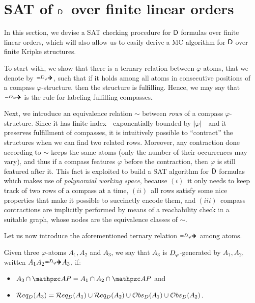 \section{SAT of $\mathsf{D}$\ over finite linear orders}\label{sec:decidability}

In this section, we devise a SAT checking procedure for $\mathsf{D}$ formulas over finite linear orders, which will also allow us to easily derive a MC algorithm for $\mathsf{D}${} over finite Kripke structures.

To start with, we show that there is a ternary relation between $\varphi$-atoms, that we denote by $\genDphi$, such that if it holds among all atoms in consecutive positions of a compass $\varphi$-structure, then the structure is fulfilling. Hence, we may say that $\genDphi$ is the rule for labeling fulfilling compasses. 

Next, we introduce an equivalence relation $\sim$ between \emph{rows} of a compass $\varphi$-structure. Since it has finite index---exponentially bounded by $|\varphi|$---and it preserves fulfillment of compasses, it is intuitively possible to ``contract'' the structures when we can find two related rows. Moreover, any contraction done according to $\sim$ keeps the same atoms (only the number of their occurrences may vary), and thus if a compass features $\varphi$ before the contraction, then $\varphi$ is still featured after it. This fact is exploited to build a SAT algorithm for $\mathsf{D}$ formulas which makes use of \emph{polynomial working space}, because $(i)$~it only needs to keep track of two rows of a compass at a time, $(ii)$~all rows satisfy some nice properties that make it possible to succinctly encode them, and $(iii)$~compass contractions are implicitly performed by means of a reachability check in a suitable graph, whose nodes are the equivalence classes of $\sim$.

Let us now introduce the aforementioned ternary relation $\genDphi$ among atoms.
\begin{definition}\label{def:d_generator}
Given three $\varphi$-atoms $A_1, A_2$ and $A_3$, we say that 
$A_3$ is $\mathrel{D_\varphi}$-generated by $A_1, A_2$,
written $A_1A_2\genDphi A_3$, if:  
\begin{itemize}
    \item $A_3\cap\AP = A_1 \cap A_2 \cap \AP$ and 
    \item $\mathcal{R} eq_D(A_3)=\mathcal{R} eq_D(A_1)\cup \mathcal{R} eq_D(A_2) \cup \mathcal{O} bs_D(A_1 )\cup \mathcal{O} bs_D (A_2)$.
\end{itemize}
\end{definition}


